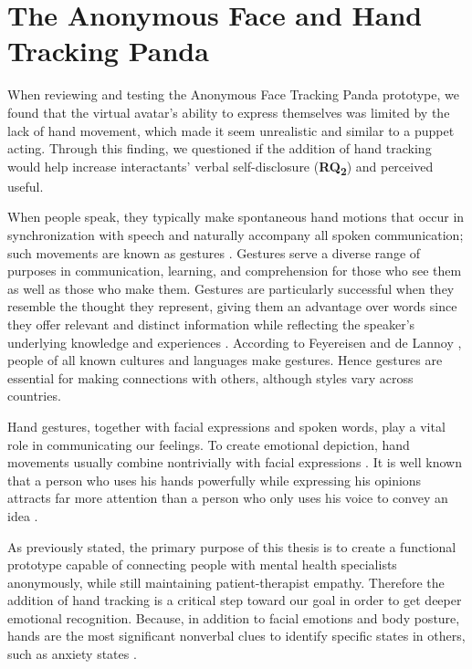 \section{The Anonymous Face and Hand Tracking Panda}
When reviewing and testing the Anonymous Face Tracking Panda prototype, we found that the virtual avatar's ability to express themselves was limited by the lack of hand movement, which made it seem unrealistic and similar to a puppet acting. Through this finding, we questioned if the addition of hand tracking would help increase interactants' verbal self-disclosure (\textbf{RQ\textsubscript{2}}) and perceived useful.

When people speak, they typically make spontaneous hand motions that occur in synchronization with speech and naturally accompany all spoken communication; such movements are known as gestures \cite{CLO20}. Gestures serve a diverse range of purposes in communication, learning, and comprehension for those who see them as well as those who make them. Gestures are particularly successful when they resemble the thought they represent, giving them an advantage over words since they offer relevant and distinct information while reflecting the speaker's underlying knowledge and experiences \cite{CLO20, KAN16B}. According to Feyereisen and de Lannoy \cite{FEY91}, people of all known cultures and languages make gestures. Hence gestures are essential for making connections with others, although styles vary across countries.

Hand gestures, together with facial expressions and spoken words, play a vital role in communicating our feelings. To create emotional depiction, hand movements usually combine nontrivially with facial expressions \cite{ARJ20}. It is well known that a person who uses his hands powerfully while expressing his opinions attracts far more attention than a person who only uses his voice to convey an idea \cite{COO10, WAK18}.

As previously stated, the primary purpose of this thesis is to create a functional prototype capable of connecting people with mental health specialists anonymously, while still maintaining patient-therapist empathy. Therefore the addition of hand tracking is a critical step toward our goal in order to get deeper emotional recognition. Because, in addition to facial emotions and body posture, hands are the most significant nonverbal clues to identify specific states in others, such as anxiety states \cite{WAX97, REI22}. 

